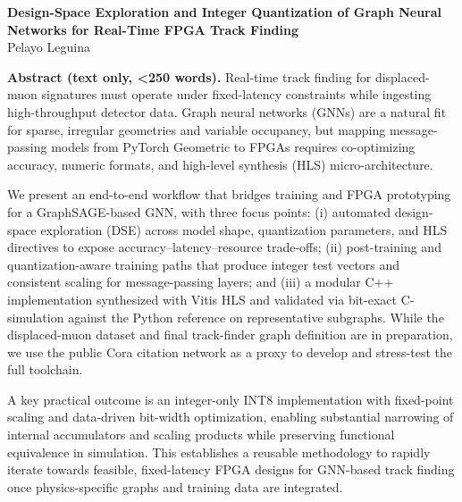 \documentclass[10pt]{article}
\begin{document}
\begin{center}
{\Large \textbf{Design-Space Exploration and Integer Quantization of Graph Neural Networks for Real-Time FPGA Track Finding}}\\
\vspace{0.25em}
{Pelayo Leguina}\
\end{center}

\noindent\textbf{Abstract (text only, <250 words).} Real-time track finding for displaced-muon signatures must operate under fixed-latency constraints while ingesting high-throughput detector data. Graph neural networks (GNNs) are a natural fit for sparse, irregular geometries and variable occupancy, but mapping message-passing models from PyTorch Geometric to FPGAs requires co-optimizing accuracy, numeric formats, and high-level synthesis (HLS) micro-architecture.

\par
We present an end-to-end workflow that bridges training and FPGA prototyping for a GraphSAGE-based GNN, with three focus points: (i) automated design-space exploration (DSE) across model shape, quantization parameters, and HLS directives to expose accuracy--latency--resource trade-offs; (ii) post-training and quantization-aware training paths that produce integer test vectors and consistent scaling for message-passing layers; and (iii) a modular C++ implementation synthesized with Vitis HLS and validated via bit-exact C-simulation against the Python reference on representative subgraphs. While the displaced-muon dataset and final track-finder graph definition are in preparation, we use the public Cora citation network as a proxy to develop and stress-test the full toolchain.

\par
A key practical outcome is an integer-only INT8 implementation with fixed-point scaling and data-driven bit-width optimization, enabling substantial narrowing of internal accumulators and scaling products while preserving functional equivalence in simulation. This establishes a reusable methodology to rapidly iterate towards feasible, fixed-latency FPGA designs for GNN-based track finding once physics-specific graphs and training data are integrated.
\end{document}
